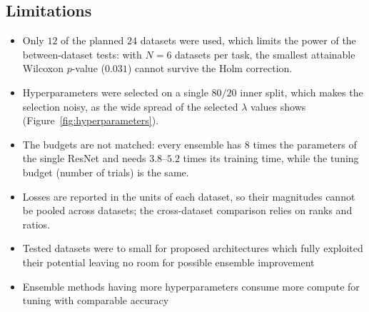 \documentclass[11pt, a4paper]{article}
\begin{document}
\subsection{Limitations}
\begin{itemize}
    \item Only $12$ of the planned $24$ datasets were used, which limits the power of the between-dataset tests: with $N = 6$ datasets per task, the smallest attainable Wilcoxon $p$-value ($0.031$) cannot survive the Holm correction.
    \item Hyperparameters were selected on a single $80/20$ inner split, which makes the selection noisy, as the wide spread of the selected $\lambda$ values shows (Figure~\ref{fig:hyperparameters}).
    \item The budgets are not matched: every ensemble has $8$ times the parameters of the single ResNet and needs $3.8$--$5.2$ times its training time, while the tuning budget (number of trials) is the same.
    \item Losses are reported in the units of each dataset, so their magnitudes cannot be pooled across datasets; the cross-dataset comparison relies on ranks and ratios.
    \item Tested datasets were to small for proposed architectures which fully exploited their potential leaving no room for possible ensemble improvement
    \item Ensemble methods having more hyperparameters consume more compute for tuning with comparable accuracy
\end{itemize}
\end{document}
